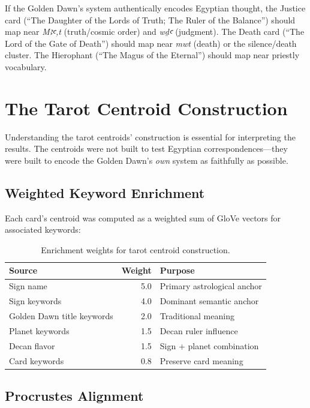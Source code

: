 \documentclass[11pt, a4paper]{article}
\begin{document}
If the Golden Dawn's system authentically encodes Egyptian thought, the Justice card (``The Daughter of the Lords of Truth; The Ruler of the Balance'') should map near \textit{Mꜣꜥ,t} (truth/cosmic order) and \textit{wḏꜥ} (judgment). The Death card (``The Lord of the Gate of Death'') should map near \textit{mwt} (death) or the silence/death cluster. The Hierophant (``The Magus of the Eternal'') should map near priestly vocabulary.

\section{The Tarot Centroid Construction}
\label{sec:construction}

Understanding the tarot centroids' construction is essential for interpreting the results. The centroids were not built to test Egyptian correspondences---they were built to encode the Golden Dawn's \textit{own} system as faithfully as possible.

\subsection{Weighted Keyword Enrichment}

Each card's centroid was computed as a weighted sum of GloVe vectors for associated keywords:

\begin{table}[H]
\centering
\begin{tabular}{lrl}
\toprule
\textbf{Source} & \textbf{Weight} & \textbf{Purpose} \\
\midrule
Sign name & 5.0 & Primary astrological anchor \\
Sign keywords & 4.0 & Dominant semantic anchor \\
Golden Dawn title keywords & 2.0 & Traditional meaning \\
Planet keywords & 1.5 & Decan ruler influence \\
Decan flavor & 1.5 & Sign + planet combination \\
Card keywords & 0.8 & Preserve card meaning \\
\bottomrule
\end{tabular}
\caption{Enrichment weights for tarot centroid construction.}
\end{table}

\subsection{Procrustes Alignment}
\end{document}
